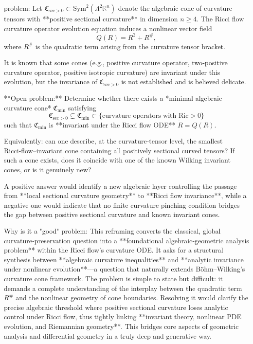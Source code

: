 problem:  
Let \(\mathfrak{C}_{\mathrm{sec}>0}\subset \mathrm{Sym}^2(\Lambda^2\mathbb{R}^n)\) denote the algebraic cone of curvature tensors with **positive sectional curvature** in dimension \(n\ge 4\).  The Ricci flow curvature operator evolution equation induces a nonlinear vector field  
\[
Q(R)=R^2 + R^{\#},
\]
where \(R^{\#}\) is the quadratic term arising from the curvature tensor bracket.  

It is known that some cones (e.g., positive curvature operator, two‑positive curvature operator, positive isotropic curvature) are invariant under this evolution, but the invariance of \(\mathfrak{C}_{\mathrm{sec}>0}\) is not established and is believed delicate.  

**Open problem:**  
Determine whether there exists a *minimal algebraic curvature cone* \(\mathfrak{C}_{\min}\) satisfying
\[
\mathfrak{C}_{\mathrm{sec}>0} \subsetneq \mathfrak{C}_{\min} \subset \{\text{curvature operators with }\mathrm{Ric}>0\}
\]
such that \(\mathfrak{C}_{\min}\) is **invariant under the Ricci flow ODE** \(\dot R = Q(R)\).  

Equivalently: can one describe, at the curvature‑tensor level, the smallest Ricci‑flow–invariant cone containing all positively sectional curved tensors?  
If such a cone exists, does it coincide with one of the known Wilking invariant cones, or is it genuinely new?  

A positive answer would identify a new algebraic layer controlling the passage from **local sectional curvature geometry** to **Ricci flow invariance**, while a negative one would indicate that no finite curvature pinching condition bridges the gap between positive sectional curvature and known invariant cones.

Why is it a "good" problem:  
This reframing converts the classical, global curvature‑preservation question into a **foundational algebraic‑geometric analysis problem** within the Ricci flow’s curvature ODE. It asks for a structural synthesis between **algebraic curvature inequalities** and **analytic invariance under nonlinear evolution**—a question that naturally extends Böhm–Wilking’s curvature cone framework.  
The problem is simple to state but difficult: it demands a complete understanding of the interplay between the quadratic term \(R^{\#}\) and the nonlinear geometry of cone boundaries. Resolving it would clarify the precise algebraic threshold where positive sectional curvature loses analytic control under Ricci flow, thus tightly linking **invariant theory, nonlinear PDE evolution, and Riemannian geometry**. This bridges core aspects of geometric analysis and differential geometry in a truly deep and generative way.